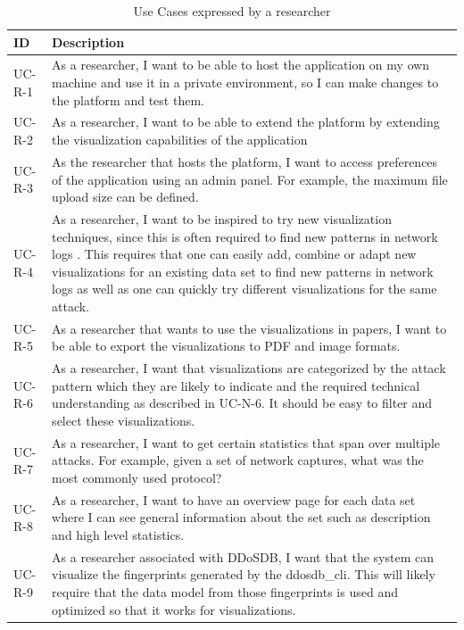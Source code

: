 \begin{table}[]
\centering
\begin{tabular}{|p{1.6cm}|p{12cm}|}
\hline
\textbf{ID} & \textbf{Description} \\ \hline

UC-R-1        & As a researcher, I want to be able to host the application on my own machine and use it in a private environment, so I can make changes to the platform and test them.\\ \hline
UC-R-2         & As a researcher, I want to be able to extend the platform by extending the visualization capabilities of the application\\ \hline
UC-R-3        & As the researcher that hosts the platform, I want to access preferences of the application using an admin panel. For example, the maximum file upload size can be defined.\\ \hline
UC-R-4       & As a researcher, I want to be inspired to try new visualization techniques, since this is often required to find new patterns in network logs \cite{appliedsecurityvisualization}. This requires that one can easily add, combine or adapt new visualizations for an existing data set to find new patterns in network logs as well as one can quickly try different visualizations for the same attack.\\ \hline
UC-R-5       & As a researcher that  wants to use the visualizations in papers, I want to be able to export the visualizations to PDF and image formats.\\ \hline
UC-R-6       & As a researcher, I want that visualizations are categorized by the attack pattern which they are likely to indicate and the required technical understanding as described in UC-N-6. It should be easy to filter and select these visualizations.\\ \hline
UC-R-7      & As a researcher, I want to get certain statistics that span over multiple attacks. For example, given a set of network captures, what was the most commonly used protocol?\\ \hline
UC-R-8      & As a researcher, I want to have an overview page for each data set where I can see general information about the set such as description and high level statistics.\\ \hline
UC-R-9     & As a researcher associated with DDoSDB, I want that the system can visualize the fingerprints generated by the ddosdb\_cli. This will likely require that the data model from those fingerprints is used and optimized so that it works for visualizations. \\ \hline
\end{tabular}
\caption{Use Cases expressed by a researcher}
\label{table:us-researcher}
\end{table} 

